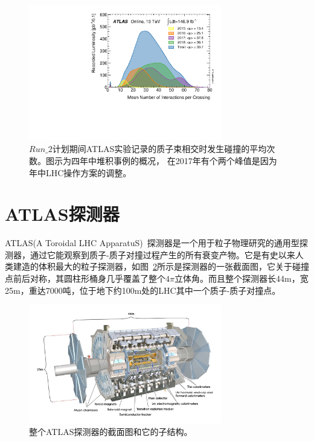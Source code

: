 \begin{figure}
  \begin{center}
    \includegraphics[width=0.75\textwidth]{figuresEXP/LHC3.pdf}
  \end{center}
  \caption{
  $Run\_2$计划期间\textsc{ATLAS}实验记录的质子束相交时发生碰撞的平均次数。图示为四年中堆积事例的概况，
  在2017年有个两个峰值是因为年中LHC操作方案的调整。
    }
    \label{fig:LHC3}
\end{figure}


\section{ATLAS探测器}
\label{sec:ATLAS}

\textsc{ATLAS}(A Toroidal LHC ApparatuS)~\cite{PERF-2007-01,ATLASPERF1,ATLASPERF2}探测器是一个用于粒子物理研究的通用型探测器，通过它能观察到质子-质子对撞过程产生的所有衰变产物。它是有史以来人类建造的体积最大的粒子探测器，如图~\ref{fig:ATLAS1}所示是探测器的一张截面图，它关于碰撞点前后对称，其圆柱形桶身几乎覆盖了整个$4\pi$立体角。而且整个探测器长44m，宽25m，重达7000吨，位于地下约100m处的LHC其中一个质子-质子对撞点。

\begin{figure}
  \begin{center}
    \includegraphics[width=0.75\textwidth]{figuresEXP/ATLAS1.jpg}
  \end{center}
  \caption{
整个\textsc{ATLAS}探测器的截面图和它的子结构。
  }
    \label{fig:ATLAS1}
\end{figure}

